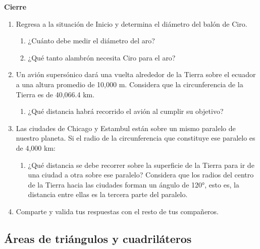 \begin{boxK}
    \begin{center}\textbf{Cierre}\end{center}
    \begin{enumerate}
        \item Regresa a la situación de Inicio y determina el diámetro del balón de Ciro.
              \begin{enumerate}
                  \item ¿Cuánto debe medir el diámetro del aro?
                  \item ¿Qué tanto alambrón necesita Ciro para el aro?
              \end{enumerate}
        \item Un avión supersónico dará una vuelta alrededor de la Tierra sobre el
              ecuador a una altura promedio de 10,000 m. Considera que la circunferencia de la Tierra es de 40,066.4 km.
              \begin{enumerate}
                  \item ¿Qué distancia habrá recorrido el avión al cumplir su objetivo?
              \end{enumerate}
        \item Las ciudades de Chicago y Estambul están sobre un mismo paralelo de
              nuestro planeta. Si el radio de la circunferencia que constituye ese
              paralelo es de 4,000 km:
              \begin{enumerate}
                  \item ¿Qué distancia se debe recorrer sobre la superficie de la Tierra para
                        ir de una ciudad a otra sobre ese paralelo? Considera que los radios
                        del centro de la Tierra hacia las ciudades forman un ángulo de 120°,
                        esto es, la distancia entre ellas es la tercera parte del paralelo.
              \end{enumerate}
        \item Comparte y valida tus respuestas con el resto de tus compañeros.
    \end{enumerate}
\end{boxK}

\newpage
\subsection{Áreas de triángulos y cuadriláteros}

